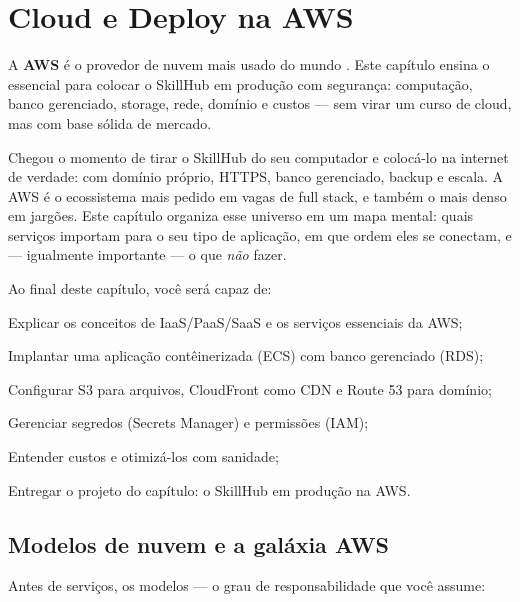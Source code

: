 \chapter{Cloud e Deploy na AWS}
\label{cap:cloud}

\begin{caixaconceito}
A \textbf{AWS} é o provedor de nuvem mais usado do mundo \cite{aws-docs}. Este
capítulo ensina o essencial para colocar o SkillHub em produção com
segurança: computação, banco gerenciado, storage, rede, domínio e custos —
sem virar um curso de cloud, mas com base sólida de mercado.
\end{caixaconceito}

Chegou o momento de tirar o SkillHub do seu computador e colocá-lo na
internet de verdade: com domínio próprio, HTTPS, banco gerenciado, backup e
escala. A AWS é o ecossistema mais pedido em vagas de full stack, e também o
mais denso em jargões. Este capítulo organiza esse universo em um mapa
mental: quais serviços importam para o seu tipo de aplicação, em que ordem
eles se conectam, e — igualmente importante — o que \emph{não} fazer.

Ao final deste capítulo, você será capaz de:
\begin{objetivos}
  \item Explicar os conceitos de IaaS/PaaS/SaaS e os serviços essenciais da AWS;
  \item Implantar uma aplicação contêinerizada (ECS) com banco gerenciado (RDS);
  \item Configurar S3 para arquivos, CloudFront como CDN e Route 53 para domínio;
  \item Gerenciar segredos (Secrets Manager) e permissões (IAM);
  \item Entender custos e otimizá-los com sanidade;
  \item Entregar o projeto do capítulo: o SkillHub em produção na AWS.
\end{objetivos}

\section{Modelos de nuvem e a galáxia AWS}

Antes de serviços, os modelos — o grau de responsabilidade que você assume:

